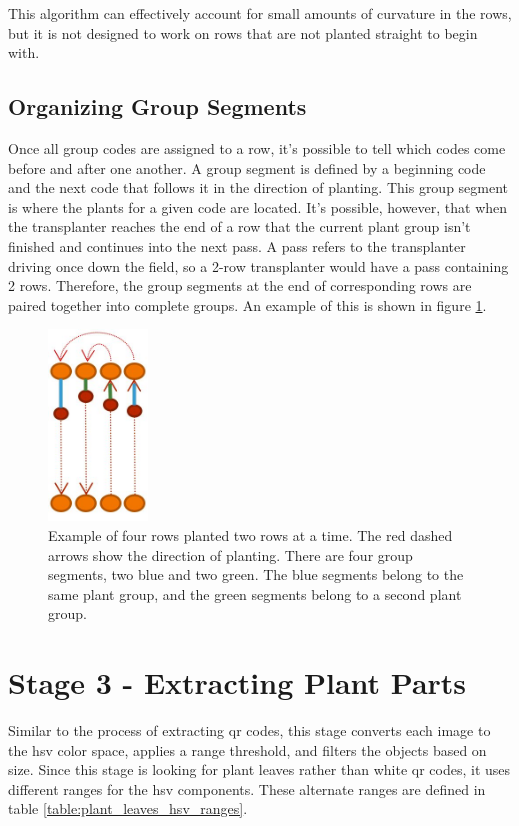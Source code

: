 This algorithm can effectively account for small amounts of curvature in the rows, but it is not designed to work on rows that are not planted straight to begin with.

\subsection{Organizing Group Segments}

Once all group codes are assigned to a row, it's possible to tell which codes come before and after one another.  A group segment is defined by a beginning code and the next code that follows it in the direction of planting.  This group segment is where the plants for a given code are located.  It's possible, however, that when the transplanter reaches the end of a row that the current plant group isn't finished and continues into the next pass.  A pass refers to the transplanter driving once down the field, so a 2-row transplanter would have a pass containing 2 rows.  Therefore, the group segments at the end of corresponding rows are paired together into complete groups.  An example of this is shown in figure \ref{figure:group_segments}.

\begin{figure}
	\centering
    \includegraphics[height=2in]{figures/group_segments.jpg}
    \caption[Group segments]{Example of four rows planted two rows at a time.  The red dashed arrows show the direction of planting.  There are four group segments, two blue and two green.  The blue segments belong to the same plant group, and the green segments belong to a second plant group.}
    \label{figure:group_segments}
\end{figure}

\section{Stage 3 - Extracting Plant Parts}
\label{processing-stage3}

Similar to the process of extracting \ac{qr} codes, this stage converts each image to the \ac{hsv} color space, applies a range threshold, and filters the objects based on size.  Since this stage is looking for plant leaves rather than white \ac{qr} codes, it uses different ranges for the \ac{hsv} components.  These alternate ranges are defined in table \ref{table:plant_leaves_hsv_ranges}.

